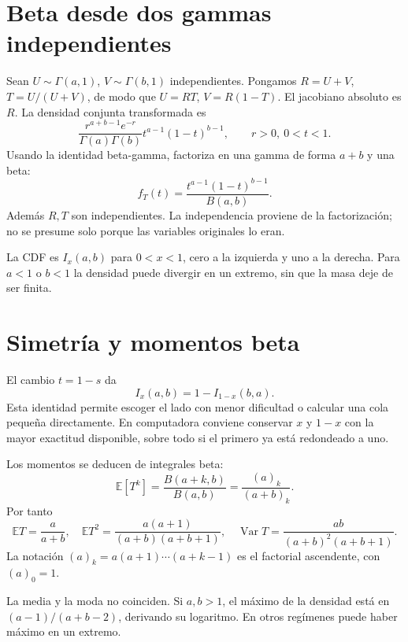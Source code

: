 \documentclass[11pt,a4paper]{article}
\newcommand{\E}{\mathbb E}
\DeclareMathOperator{\Var}{Var}
\theoremstyle{definition}
\begin{document}
\section{Beta desde dos gammas independientes}
Sean $U\sim\Gamma(a,1)$, $V\sim\Gamma(b,1)$ independientes. Pongamos $R=U+V$, $T=U/(U+V)$, de modo que $U=RT$, $V=R(1-T)$. El jacobiano absoluto es $R$. La densidad conjunta transformada es
\[
\frac{r^{a+b-1}e^{-r}}{\Gamma(a)\Gamma(b)}
t^{a-1}(1-t)^{b-1},\qquad r>0,\ 0<t<1.
\]
Usando la identidad beta-gamma, factoriza en una gamma de forma $a+b$ y una beta:
\[
f_T(t)=\frac{t^{a-1}(1-t)^{b-1}}{B(a,b)}.
\]
Además $R,T$ son independientes. La independencia proviene de la factorización; no se presume solo porque las variables originales lo eran.

La CDF es $I_x(a,b)$ para $0<x<1$, cero a la izquierda y uno a la derecha. Para $a<1$ o $b<1$ la densidad puede divergir en un extremo, sin que la masa deje de ser finita.

\section{Simetría y momentos beta}
El cambio $t=1-s$ da
\[
I_x(a,b)=1-I_{1-x}(b,a).
\]
Esta identidad permite escoger el lado con menor dificultad o calcular una cola pequeña directamente. En computadora conviene conservar $x$ y $1-x$ con la mayor exactitud disponible, sobre todo si el primero ya está redondeado a uno.

Los momentos se deducen de integrales beta:
\[
\E[T^k]=\frac{B(a+k,b)}{B(a,b)}
=\frac{(a)_k}{(a+b)_k}.
\]
Por tanto
\[
\E T=\frac a{a+b},\quad
\E T^2=\frac{a(a+1)}{(a+b)(a+b+1)},\quad
\Var T=\frac{ab}{(a+b)^2(a+b+1)}.
\]
La notación $(a)_k=a(a+1)\cdots(a+k-1)$ es el factorial ascendente, con $(a)_0=1$.

La media y la moda no coinciden. Si $a,b>1$, el máximo de la densidad está en $(a-1)/(a+b-2)$, derivando su logaritmo. En otros regímenes puede haber máximo en un extremo.
\end{document}
